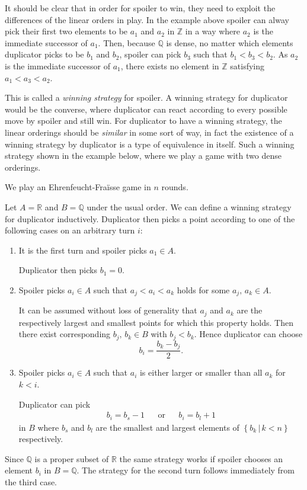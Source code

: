 \documentclass[../../main.tex]{subfiles}
\begin{document}
It should be clear that in order for spoiler to win, they need to exploit the differences of the linear orders in play.
In the example above spoiler can alway pick their first two elements to be $a_1$ and $a_2$ in $\mathbb{Z}$ in a way where $a_2$ is the immediate successor of $a_1$.
Then, because $\mathbb{Q}$ is dense, no matter which elements duplicator picks to be $b_1$ and $b_2$, spoiler can pick $b_3$ such that $b_1 < b_3 < b_2$.
As $a_2$ is the immediate successor of $a_1$, there exists no element in $\mathbb{Z}$ satisfying  $a_1 < a_3 < a_2$.

This is called a \textit{winning strategy} for spoiler.
A winning strategy for duplicator would be the converse, where duplicator can react according to every possible move by spoiler and still win.
For duplicator to have a winning strategy, the linear orderings should be \textit{similar} in some sort of way, 
in fact the existence of a winning strategy by duplicator is a type of equivalence in itself.
Such a winning strategy shown in the example below, where we play a game with two dense orderings.

\begin{example}\label{game-example-2}
    We play an Ehrenfeucht-Fra\"isse game in $n$ rounds.

    Let $A = \mathbb{R}$ and $B=\mathbb{Q}$ under the usual order.
    We can define a winning strategy for duplicator inductively.
    Duplicator then picks a point according to one of the following cases on an arbitrary turn $i$:
    \begin{enumerate}
        \item It is the first turn and spoiler picks $a_1 \in A$.
        
        Duplicator then picks $b_1 = 0$.
        \item Spoiler picks $a_i \in A$ such that $a_j < a_i < a_k$ holds for some $a_j,\, a_k \in A$.
        
        It can be assumed without loss of generality that $a_j$ and $a_k$ are the respectively largest and smallest points for which this property holds.
        Then there exist corresponding $b_j,\, b_k \in B$ with $b_j < b_k$. Hence duplicator can choose $$b_i = \frac{b_k - b_j}{2}.$$
        \item Spoiler picks $a_i \in A$ such that $a_i$ is either larger or smaller than all $a_k$ for $k < i$.
        
        Duplicator can pick 
        \begin{align*}
            b_i = b_s - 1 && \text{or} && b_i = b_l + 1
        \end{align*}
        in $B$ where $b_s$ and $b_l$ are the smallest and largest elements of $\left\{b_k \,\vert\, k < n\right\}$ respectively.
    \end{enumerate}    
    Since $\mathbb{Q}$ is a proper subset of $\mathbb{R}$ the same strategy works if spoiler chooses an element $b_i$ in $B = \mathbb{Q}$.
    The strategy for the second turn follows immediately from the third case. 
\end{example}
\end{document}
